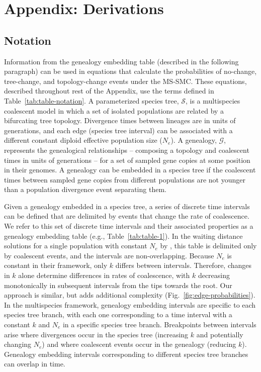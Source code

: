 \documentclass[11pt]{article}
\begin{document}
\section{Appendix: Derivations}

\subsection{Notation}

Information from the genealogy embedding table (described in the following paragraph) can be used 
in equations that 
calculate the 
probabilities of no-change, tree-change, and topology-change events under the 
MS-SMC. These equations, described throughout rest of the Appendix, use the terms defined in 
Table~\ref{tab:table-notation}. 
A parameterized species tree, $\mathcal{S}$, is a multispecies coalescent 
model in which a set of isolated populations are related by a bifurcating
tree topology. Divergence times between lineages are in units of generations, 
and each edge (species tree interval) can be associated with a different constant 
diploid effective population size ($N_e$). 
A genealogy, $\mathcal{G}$, represents the genealogical relationships -- composing
a topology and coalescent times in units of generations -- for a set 
of sampled gene copies at some position in their genomes. A genealogy can be 
embedded in a species tree if the coalescent times between sampled gene copies
from different populations are not younger than a population divergence
event separating them.


Given a genealogy embedded in a species tree, a series of discrete
time intervals can be defined that are delimited 
by events that change the rate of coalescence. 
We refer to this 
set of discrete time intervals and their associated properties
as a genealogy embedding table (e.g., Table~\ref{tab:table-1}). 
In the waiting distance solutions for a single population with constant $N_e$ 
by \citet{deng_distribution_2021}, this table is delimited only by coalescent 
events, and the intervals are non-overlapping. 
Because $N_e$ is constant in their framework, only $k$ differs between 
intervals. Therefore, changes in $k$ alone determine differences in rates of coalescence, 
with $k$ decreasing monotonically in subsequent intervals from the tips towards the root. 
Our approach is similar, but adds additional complexity (Fig.~\ref{fig:edge-probabilities}). 
In the multispecies framework, genealogy embedding intervals are specific to each 
species tree branch, with each one corresponding to a time interval with a constant 
$k$ and $N_e$ in a specific species tree branch. 
Breakpoints between intervals arise where divergences 
occur in the species tree (increasing $k$ and potentially changing $N_e$) 
and where coalescent events occur in the genealogy (reducing $k$). 
Genealogy embedding intervals corresponding to different species tree 
branches can overlap in time.
\end{document}
